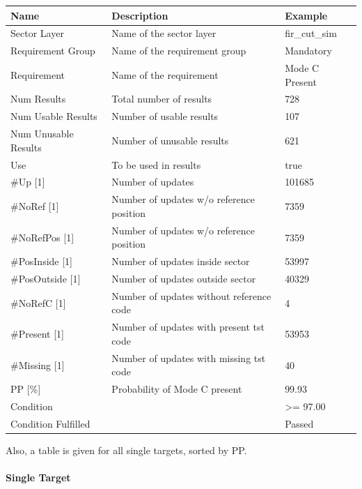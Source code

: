 \begin{center}
 \begin{table}[H]
  \begin{tabularx}{\textwidth}{ | l | X |  l | }
    \hline
    \textbf{Name} & \textbf{Description} & \textbf{Example} \\ \hline
    Sector Layer & Name of the sector layer & fir\_cut\_sim \\ \hline
    Requirement Group & Name of the requirement group & Mandatory \\ \hline
    Requirement & Name of the requirement & Mode C Present \\ \hline
    Num Results & Total number of results & 728 \\ \hline
    Num Usable Results & Number of usable results & 107 \\ \hline
    Num Unusable Results & Number of unusable results & 621 \\ \hline
    Use & To be used in results & true \\ \hline
    \#Up [1] & Number of updates & 101685 \\ \hline
    \#NoRef [1] & Number of updates w/o reference position & 7359 \\ \hline
    \#NoRefPos [1] & Number of updates w/o reference position  & 7359 \\ \hline
    \#PosInside [1] & Number of updates inside sector & 53997 \\ \hline
    \#PosOutside [1] & Number of updates outside sector & 40329 \\ \hline
    \#NoRefC [1] & Number of updates without reference code & 4 \\ \hline
    \#Present [1] & Number of updates with present tst code & 53953 \\ \hline
    \#Missing [1] & Number of updates with missing tst code & 40 \\ \hline
    PP [\%] & Probability of Mode C present & 99.93 \\ \hline
    Condition &  & >= 97.00 \\ \hline
    Condition Fulfilled &  & Passed \\ \hline
\end{tabularx}
\end{table}
\end{center}

Also, a table is given for all single targets, sorted by PP.

\paragraph{Single Target}

